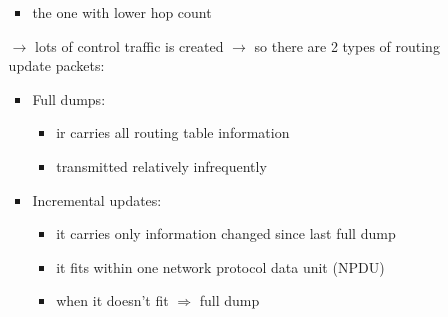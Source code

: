 \begin{itemize}
\begin{itemize}
\begin{itemize}
            \item the one with lower hop count
        \end{itemize}
        \item[$\rightarrow$] lots of control traffic is created $\rightarrow$ so there are 2 types of routing update
        packets:
        \begin{itemize}
            \item Full dumps:
            \begin{itemize}
                \item ir carries all routing table information
                \item transmitted relatively infrequently
            \end{itemize}
            \item Incremental updates:
            \begin{itemize}
                \item it carries only information changed since last full dump
                \item it fits within one network protocol data unit (NPDU)
                \item when it doesn't fit $\Rightarrow$ full dump
            \end{itemize}
        \end{itemize}
    \end{itemize}
\end{itemize}

